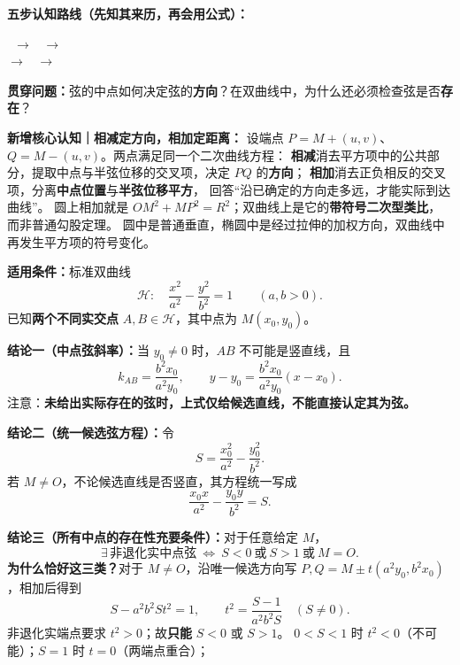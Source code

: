 \begin{center}\end{center}
\begin{statementbox}

\textbf{五步认知路线（先知其来历，再会用公式）：}
\begin{center}
\small
{}\ $\longrightarrow$\ 
$\longrightarrow$\ \\[3pt]
$\longrightarrow$\ 
$\longrightarrow$\ 
\end{center}
\textbf{贯穿问题：}弦的中点如何决定弦的\textbf{方向}？在双曲线中，为什么还必须检查弦是否\textbf{存在}？
\par\smallskip\noindent
\textbf{新增核心认知｜相减定方向，相加定距离：}
设端点 $P=M+(u,v)$、$Q=M-(u,v)$。两点满足同一个二次曲线方程：
\textbf{相减}消去平方项中的公共部分，提取中点与半弦位移的交叉项，决定 $PQ$ 的\textbf{方向}；
\textbf{相加}消去正负相反的交叉项，分离\textbf{中点位置}与\textbf{半弦位移平方}，
回答“沿已确定的方向走多远，才能实际到达曲线”。
圆上相加就是 $OM^2+MP^2=R^2$；双曲线上是它的\textbf{带符号二次型类比}，而非普通勾股定理。
圆中是普通垂直，椭圆中是经过拉伸的加权方向，双曲线中再发生平方项的符号变化。
\par\medskip\noindent
\textbf{适用条件：}标准双曲线
\[
\mathcal H:\quad \frac{x^2}{a^2}-\frac{y^2}{b^2}=1\qquad(a,b>0).
\]
已知\textbf{两个不同实交点} $A,B\in\mathcal H$，其中点为 $M(x_0,y_0)$。
\par\medskip\noindent
\textbf{结论一（中点弦斜率）：}当 $y_0\ne0$ 时，$AB$ 不可能是竖直线，且
\[
\boxed{k_{AB}=\frac{b^2x_0}{a^2y_0}},\qquad
\boxed{y-y_0=\frac{b^2x_0}{a^2y_0}(x-x_0)}.
\]
注意：\textbf{未给出实际存在的弦时，上式仅给候选直线，不能直接认定其为弦。}
\par\medskip\noindent
\textbf{结论二（统一候选弦方程）：}令
\[
S=\frac{x_0^2}{a^2}-\frac{y_0^2}{b^2}.
\]
若 $M\ne O$，不论候选直线是否竖直，其方程统一写成
\[
\boxed{\frac{x_0x}{a^2}-\frac{y_0y}{b^2}=S.}
\]
\begin{minipage}{\linewidth}
\textbf{结论三（所有中点的存在性充要条件）：}对于任意给定 $M$，
\[
\boxed{\exists\,\text{非退化实中点弦}\ \Longleftrightarrow\ S<0\ \text{或}\ S>1\ \text{或}\ M=O.}
\]
\textbf{为什么恰好这三类？}对于 $M\ne O$，沿唯一候选方向写
$P,Q=M\pm t(a^2y_0,b^2x_0)$，相加后得到
\[
\boxed{S-a^2b^2St^2=1},\qquad
\boxed{t^2=\frac{S-1}{a^2b^2S}}\quad(S\ne0).
\]
非退化实端点要求 $t^2>0$；故\textbf{只能} $S<0$ 或 $S>1$。
$0<S<1$ 时 $t^2<0$（不可能）；$S=1$ 时 $t=0$（两端点重合）；

\end{minipage}
\end{statementbox}
